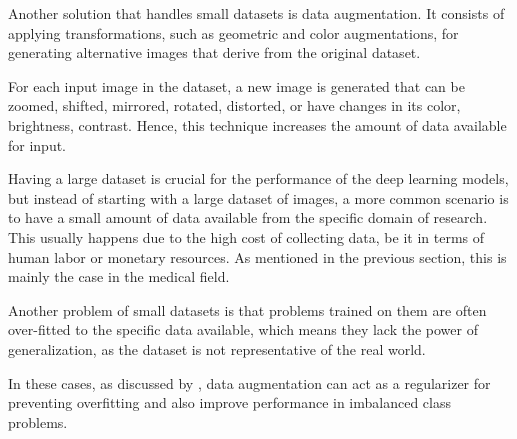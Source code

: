 Another solution that handles small datasets is data augmentation. It consists of applying transformations, such as geometric and color augmentations, for generating alternative images that derive from the original dataset.

For each input image in the dataset, a new image is generated that can be zoomed, shifted, mirrored, rotated, distorted, or have changes in its color, brightness, contrast. Hence, this technique increases the amount of data available for input. 

Having a large dataset is crucial for the performance of the deep learning models, but instead of starting with a large dataset of images, a more common scenario is to have a small amount of data available from the specific domain of research. This usually happens due to the high cost of collecting data, be it in terms of human labor or monetary resources. As mentioned in the previous section, this is mainly the case in the medical field. 

Another problem of small datasets is that problems trained on them are often over-fitted to the specific data available, which means they lack the power of generalization, as the dataset is not representative of the real world. 

In these cases, as discussed by \cite{abs-1712-04621}, data augmentation can act as a regularizer for preventing overfitting and also improve performance in imbalanced class problems.


